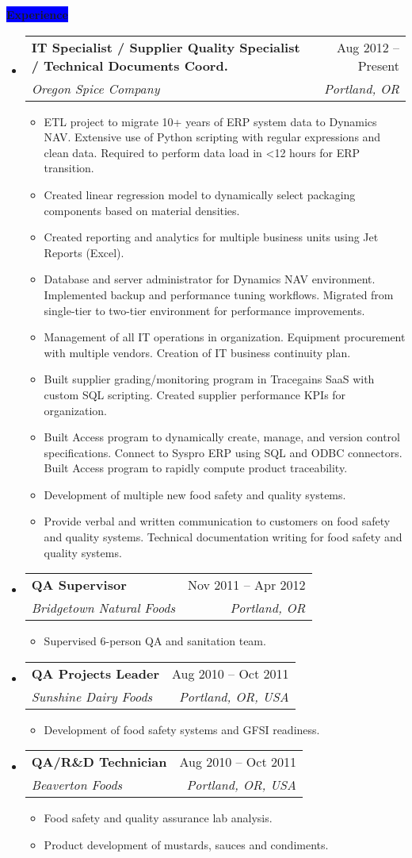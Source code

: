 \documentclass[letterpaper,12pt]{article}[leftmargin=*]
\makeatletter
\def \entryspacing {-0pt}
\newcommand{\experience}[2]{\vspace{6pt}
  \colorbox{Blue}{\color{white}\raggedbottom\normalsize\textbf{{#1}{\hspace{9pt}#2\hspace{4pt}}}}
}
\newcommand{\resumeEntryStart}{\begin{itemize}[leftmargin=2.5mm]}
\newcommand{\resumeEntryEnd}{\end{itemize}\vspace{\entryspacing}}
\newcommand{\resumeItemListStart}{\begin{itemize}[leftmargin=4.5mm]}
\newcommand{\resumeItemListEnd}{\end{itemize}}
\newcommand{\resumeItem}[1]{
  \item\small{
    {#1 \vspace{-2pt}}
  }
}
\newcommand{\resumeEntryTSDL}[4]{
  \vspace{-1pt}\item[]
    \begin{tabularx}{0.97\textwidth}{X@{\hspace{60pt}}r}
      \textbf{\color{primary}#1} & {\firabook\color{accent}\small#2} \\
      \textit{\color{accent}\small#3} & \textit{\color{accent}\small#4} \\
    \end{tabularx}\vspace{-6pt}
}
\makeatother
\begin{document}
\experience{\faPieChart}{Experience}
 \resumeEntryStart
   \resumeEntryTSDL
      {IT Specialist / Supplier Quality Specialist / Technical Documents Coord.}{Aug 2012 -- Present}
      {Oregon Spice Company}{Portland, OR}
   \resumeItemListStart
    \resumeItem {ETL project to migrate 10+ years of ERP system data to Dynamics NAV. Extensive use of Python scripting with regular expressions and clean data. Required to perform data load in <12 hours for ERP transition.
}
    \resumeItem {Created linear regression model to dynamically select packaging components based on material densities.}
    \resumeItem {Created reporting and analytics for multiple business units using Jet Reports (Excel).}
    \resumeItem {Database and server administrator for Dynamics NAV environment. Implemented backup and performance tuning workflows. Migrated from single-tier to two-tier environment for performance improvements.}
    \resumeItem {Management of all IT operations in organization. Equipment procurement with multiple vendors. Creation of IT business continuity plan.}
    \resumeItem {Built supplier grading/monitoring program in Tracegains SaaS with custom SQL scripting. Created supplier performance KPIs for organization.}
    \resumeItem {Built Access program to dynamically create, manage, and version control specifications. Connect to Syspro ERP using SQL and ODBC connectors. Built Access program to rapidly compute product traceability.}
    \resumeItem {Development of multiple new food safety and quality systems.}
    \resumeItem {Provide verbal and written communication to customers on food safety and quality systems. Technical documentation writing for food safety and quality systems.}
  \resumeItemListEnd
 \resumeEntryEnd

  \resumeEntryStart
    \resumeEntryTSDL
      {QA Supervisor}{Nov 2011 -- Apr 2012}
      {Bridgetown Natural Foods}{Portland, OR}
    \resumeItemListStart
      \resumeItem {Supervised 6-person QA and sanitation team.}
    \resumeItemListEnd
  \resumeEntryEnd
  
\pagebreak 

   \resumeEntryStart
    \resumeEntryTSDL
      {QA Projects Leader}{Aug 2010 -- Oct 2011}
      {Sunshine Dairy Foods}{Portland, OR, USA}
    \resumeItemListStart
      \resumeItem {Development of food safety systems and GFSI readiness.}
    \resumeItemListEnd
  \resumeEntryEnd
  
  \resumeEntryStart
    \resumeEntryTSDL
      {QA/R\&D Technician}{Aug 2010 -- Oct 2011}
      {Beaverton Foods}{Portland, OR, USA}
    \resumeItemListStart
      \resumeItem {Food safety and quality assurance lab analysis.}
      \resumeItem {Product development of mustards, sauces and condiments.}
    \resumeItemListEnd
  \resumeEntryEnd
  
\end{document}
